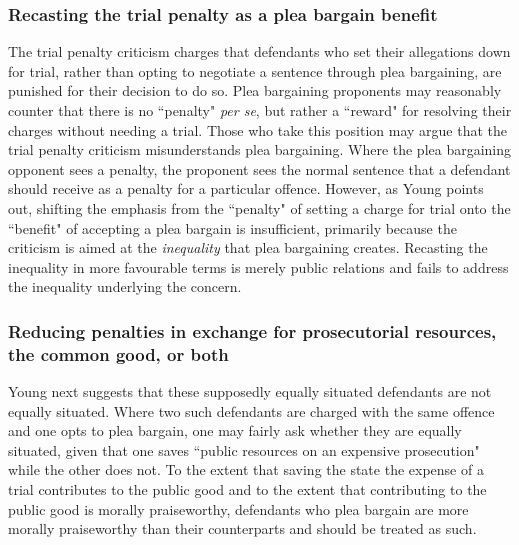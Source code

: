 \subsubsection{Recasting the trial penalty as a plea bargain benefit}

The trial penalty criticism charges that defendants who set their allegations down for trial, rather than opting to negotiate a sentence through plea bargaining, are punished for their decision to do so. Plea bargaining proponents may reasonably counter that there is no ``penalty" \textit{per se}, but rather a ``reward" for resolving their charges without needing a trial. Those who take this position may argue that the trial penalty criticism misunderstands plea bargaining. Where the plea bargaining opponent sees a penalty, the proponent sees the normal sentence that a defendant should receive as a penalty for a particular offence. However, as Young points out, shifting the emphasis from the ``penalty" of setting a charge for trial onto the ``benefit" of accepting a plea bargain is insufficient, primarily because the criticism is aimed at the \textit{inequality} that plea bargaining creates. Recasting the inequality in more favourable terms is merely public relations and fails to address the inequality underlying the concern.

\subsubsection{Reducing penalties in exchange for prosecutorial resources, the common good, or both}

Young next suggests that these supposedly equally situated defendants are not equally situated. Where two such defendants are charged with the same offence and one opts to plea bargain, one may fairly ask whether they are equally situated, given that one saves ``public resources on an expensive prosecution" while the other does not. To the extent that saving the state the expense of a trial contributes to the public good and to the extent that contributing to the public good is morally praiseworthy, defendants who plea bargain are more morally praiseworthy than their counterparts and should be treated as such. 

